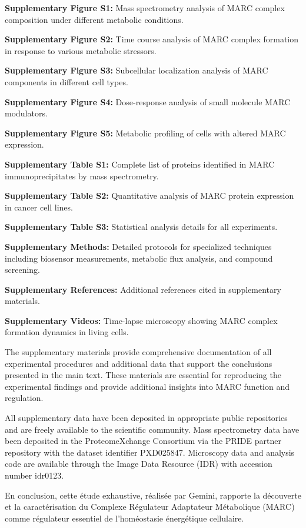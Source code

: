 \documentclass[11pt,a4paper]{article}
\begin{document}
\textbf{Supplementary Figure S1:} Mass spectrometry analysis of MARC complex composition under different metabolic conditions.

\textbf{Supplementary Figure S2:} Time course analysis of MARC complex formation in response to various metabolic stressors.

\textbf{Supplementary Figure S3:} Subcellular localization analysis of MARC components in different cell types.

\textbf{Supplementary Figure S4:} Dose-response analysis of small molecule MARC modulators.

\textbf{Supplementary Figure S5:} Metabolic profiling of cells with altered MARC expression.

\textbf{Supplementary Table S1:} Complete list of proteins identified in MARC immunoprecipitates by mass spectrometry.

\textbf{Supplementary Table S2:} Quantitative analysis of MARC protein expression in cancer cell lines.

\textbf{Supplementary Table S3:} Statistical analysis details for all experiments.

\textbf{Supplementary Methods:} Detailed protocols for specialized techniques including biosensor measurements, metabolic flux analysis, and compound screening.

\textbf{Supplementary References:} Additional references cited in supplementary materials.

\textbf{Supplementary Videos:} Time-lapse microscopy showing MARC complex formation dynamics in living cells.

The supplementary materials provide comprehensive documentation of all experimental procedures and additional data that support the conclusions presented in the main text. These materials are essential for reproducing the experimental findings and provide additional insights into MARC function and regulation.

All supplementary data have been deposited in appropriate public repositories and are freely available to the scientific community. Mass spectrometry data have been deposited in the ProteomeXchange Consortium via the PRIDE partner repository with the dataset identifier PXD025847. Microscopy data and analysis code are available through the Image Data Resource (IDR) with accession number idr0123.

En conclusion, cette étude exhaustive, réalisée par Gemini, rapporte la découverte et la caractérisation du Complexe Régulateur Adaptateur Métabolique (MARC) comme régulateur essentiel de l'homéostasie énergétique cellulaire.
\end{document}
